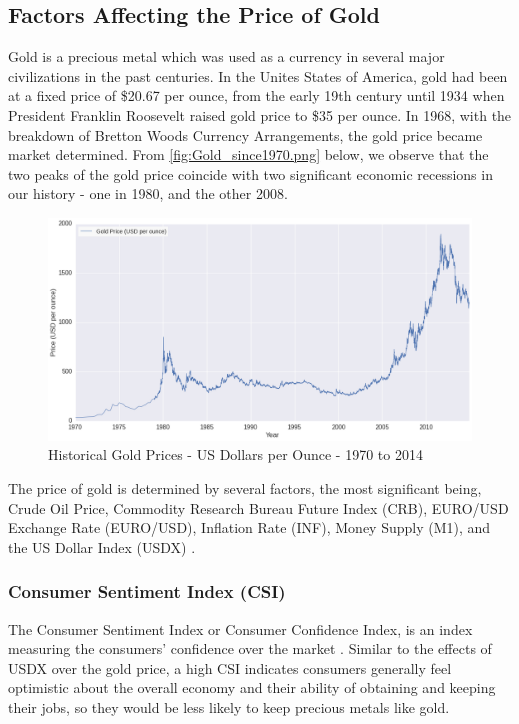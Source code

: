 \documentclass[runningheads]{llncs}
\begin{document}
\subsection{Factors Affecting the Price of Gold}
Gold is a precious metal which was used as a currency in several major civilizations in the past centuries. In the Unites States of America, gold had been at a fixed price of \$20.67 per ounce, from the early 19th century until 1934 when President Franklin Roosevelt raised gold price to \$35 per ounce. In 1968, with the breakdown of Bretton Woods Currency Arrangements, the gold price became market determined. From \autoref{fig:Gold_since1970.png} below, we observe that the two peaks of the gold price coincide with two significant economic recessions in our history - one in 1980, and the other 2008.\\

\begin{figure}
\centering
\includegraphics[width=\textwidth]{Gold_since1970.png}
\caption{Historical Gold Prices - US Dollars per Ounce - 1970 to 2014}
\label{fig:Gold_since1970.png}
\end{figure}

\noindent The price of gold is determined by several factors, the most significant being, Crude Oil Price, Commodity Research Bureau Future Index (CRB), EURO/USD Exchange Rate (EURO/USD), Inflation Rate (INF), Money Supply (M1), and the US Dollar Index (USDX) \cite{gold-shafiee}\cite{gold-zhang}\cite{gold-Ismail}. 

\subsubsection{Consumer Sentiment Index (CSI)} 
The Consumer Sentiment Index or Consumer Confidence Index, is an index measuring the consumers' confidence over the market \cite{csi-1}\cite{csi-2}. Similar to the effects of USDX over the gold price, a high CSI indicates consumers generally feel optimistic about the overall economy and their ability of obtaining and keeping their jobs, so they would be less likely to keep precious metals like gold.
\end{document}

